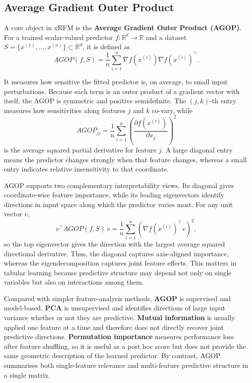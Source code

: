 \subsection{Average Gradient Outer Product}

A core object in xRFM is the \textbf{Average Gradient Outer Product (AGOP)}. For a trained scalar-valued predictor \(f : \mathbb{R}^{d} \rightarrow \mathbb{R}\) and a dataset \(S = \{x^{(1)}, \ldots, x^{(n)}\} \subset \mathbb{R}^{d}\), it is defined as
\[
  AGOP(f,S) = \frac{1}{n}\sum_{i=1}^{n} \nabla f\!\left(x^{(i)}\right)\nabla f\!\left(x^{(i)}\right)^{\top}.
\]

It measures how sensitive the fitted predictor is, on average, to small input perturbations. Because each term is an outer product of a gradient vector with itself, the AGOP is symmetric and positive semidefinite. The \((j,k)\)-th entry measures how sensitivities along features \(j\) and \(k\) co-vary, while
\[
  AGOP_{jj}
  =
  \frac{1}{n}\sum_{i=1}^{n}
  \left(
    \frac{\partial f\!\left(x^{(i)}\right)}{\partial x_j}
  \right)^2
\]
is the average squared partial derivative for feature \(j\). A large diagonal entry means the predictor changes strongly when that feature changes, whereas a small entry indicates relative insensitivity to that coordinate.

AGOP supports two complementary interpretability views. Its diagonal gives coordinate-wise feature importance, while its leading eigenvectors identify directions in input space along which the predictor varies most. For any unit vector \(v\),
\[
  v^{\top} AGOP(f,S)\, v
  =
  \frac{1}{n}\sum_{i=1}^{n}
  \left(
    \nabla f\!\left(x^{(i)}\right)^{\top} v
  \right)^2,
\]
so the top eigenvector gives the direction with the largest average squared directional derivative. Thus, the diagonal captures axis-aligned importance, whereas the eigendecomposition captures joint feature effects. This matters in tabular learning because predictive structure may depend not only on single variables but also on interactions among them.

Compared with simpler feature-analysis methods, \textbf{AGOP} is supervised and model-based. \textbf{PCA} is unsupervised and identifies directions of large input variance whether or not they are predictive. \textbf{Mutual information} is usually applied one feature at a time and therefore does not directly recover joint predictive directions. \textbf{Permutation importance} measures performance loss after feature shuffling, so it is useful as a post hoc score but does not provide the same geometric description of the learned predictor. By contrast, AGOP summarises both single-feature relevance and multi-feature predictive structure in a single matrix.

